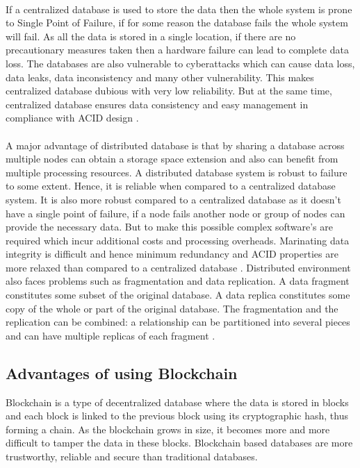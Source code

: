\documentclass{article}
\begin{document}
        \paragraph{}
        If a centralized database is used to store the data then the whole system is prone to Single Point of Failure, if for some reason the database fails the whole system will fail. As all the data is stored in a single location, if there are no  precautionary measures taken then a hardware failure can lead to complete data loss. The databases are also vulnerable to cyberattacks which can cause data loss, data leaks, data inconsistency and many other vulnerability. This makes centralized database dubious with very low reliability. But at the same time, centralized database ensures data consistency and easy management in compliance with ACID design \cite{centralizeddistributeddatabases}.
        
        \paragraph{}
        A major advantage of distributed database is that by sharing a database across  multiple nodes can obtain a storage space extension and also can benefit from multiple processing resources. A distributed database system is robust to failure to some extent. Hence, it is reliable when compared to a  centralized database system. It is also more robust compared to a centralized database as it doesn't have a single point of failure, if a node fails another node or group of nodes can provide the necessary data. But to make this possible complex software's are required which incur additional costs and processing overheads. Marinating data integrity is difficult and hence minimum redundancy and ACID properties are more relaxed than compared to a centralized database \cite{centralizeddistributeddatabases}. Distributed environment also faces problems such as fragmentation and data replication. A data fragment constitutes some subset of the original database. A data replica constitutes some copy of the whole or part of the original database. The fragmentation and the replication can be combined: a relationship can be partitioned into several pieces and can have multiple replicas of each fragment \cite{distributedsystems}.
        
    \subsection{Advantages of using Blockchain}
        Blockchain is a type of decentralized database where the data is stored in blocks and each block is linked to the previous block using its cryptographic hash, thus forming a chain. As the blockchain grows in size, it becomes more and more difficult to tamper the data in these blocks. Blockchain based databases are more trustworthy, reliable and secure than traditional databases.
\end{document}

